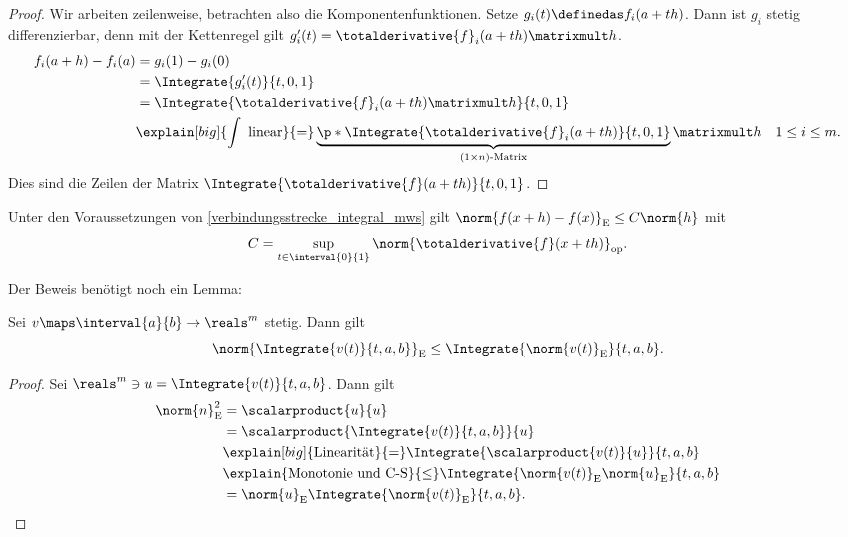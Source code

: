 \begin{proof}
    Wir arbeiten zeilenweise, betrachten also die Komponentenfunktionen. Setze \( g_i(t)\definedas f_i(a+th) \). Dann ist \( g_i \) stetig differenzierbar, denn mit der Kettenregel gilt \( g_i'(t)=\totalderivative{f}_i(a+th)\matrixmult h \).
    \begin{equation*}
        \begin{split}
            f_i(a+h)-f_i(a)&=g_i(1)-g_i(0)\\
            &=\Integrate{g_i'(t)}{t,0,1}\\
            &=\Integrate{\totalderivative{f}_i(a+th)\matrixmult h}{t,0,1}\\
            &\explain[big]{\int \text{ linear}}{=}\underbrace{\p*{ \Integrate{\totalderivative{f}_i(a+th)}{t,0,1} }}_{(1\times n)\text{-Matrix}}\matrixmult h\quad 1\leq i \leq m.
        \end{split}
    \end{equation*}
    Dies sind die Zeilen der Matrix \( \Integrate{\totalderivative{f}(a+th)}{t,0,1} \).
\end{proof}
\begin{folgerung}\label{differenz_abschaetzung_ableitung_verbindungsstrecke}
    Unter den Voraussetzungen von \ref{verbindungsstrecke_integral_mws} gilt \( \norm{f(x+h)-f(x)}_{\text{E}}\leq C\norm{h} \) mit
    \begin{equation*}
        C=\sup_{t\in \interval{0}{1}}\norm{\totalderivative{f}(x+th)}_{\text{op}}.
    \end{equation*}
\end{folgerung}
Der Beweis benötigt noch ein Lemma:
\begin{lemma}\label{integral_norm_dreiecksungleichung}
    Sei \( v\maps \interval{a}{b}\to \reals^m \) stetig. Dann gilt
    \begin{equation*}
        \norm{\Integrate{v(t)}{t,a,b}}_{\text{E}}\leq \Integrate{\norm{v(t)}_{\text{E}}}{t,a,b}.
    \end{equation*}
\end{lemma}
\begin{proof}
    Sei \( \reals^m\ni u=\Integrate{v(t)}{t,a,b} \). Dann gilt
    \begin{equation*}
        \begin{split}
            \norm{n}_{\text{E}}^2&=\scalarproduct{u}{u}\\
            &=\scalarproduct{\Integrate{v(t)}{t,a,b}}{u}\\
            &\explain[big]{\text{Linearität}}{=}\Integrate{\scalarproduct{v(t)}{u}}{t,a,b}\\
            &\explain{\text{Monotonie und C-S}}{\leq}\Integrate{\norm{v(t)}_{\text{E}}\norm{u}_{\text{E}}}{t,a,b}\\
            &=\norm{u}_{\text{E}} \Integrate{\norm{v(t)}_{\text{E}}}{t,a,b}.
        \end{split}
    \end{equation*}
\end{proof}
